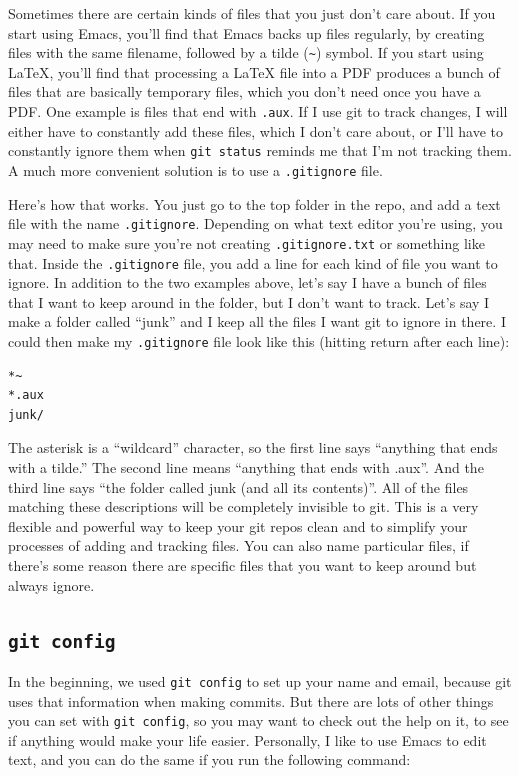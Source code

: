 \documentclass[11pt]{article}
\begin{document}
Sometimes there are certain kinds of files that you just don't care about.  If you start using Emacs, you'll find that Emacs backs up files regularly, by creating files with the same filename, followed by a tilde (\texttt{\textasciitilde{}}) symbol. If you start using \LaTeX{}, you'll find that processing a \LaTeX{} file into a PDF produces a bunch of files that are basically temporary files, which you don't need once you have a PDF.  One example is files that end with \texttt{.aux}.  If I use git to track changes, I will either have to constantly add these files, which I don't care about, or I'll have to constantly ignore them when \texttt{git status} reminds me that I'm not tracking them.  A much more convenient solution is to use a \texttt{.gitignore} file.  

Here's how that works. You just go to the top folder in the repo, and add a text file with the name \texttt{.gitignore}.  Depending on what text editor you're using, you may need to make sure you're not creating \texttt{.gitignore.txt} or something like that.  Inside the \texttt{.gitignore} file, you add a line for each kind of file you want to ignore.  In addition to the two examples above, let's say I have a bunch of files that I want to keep around in the folder, but I don't want to track. Let's say I make a folder called ``junk'' and I keep all the files I want git to ignore in there.  I could then make my \texttt{.gitignore} file look like this (hitting return after each line):


\begin{verbatim}
*~
*.aux
junk/
\end{verbatim}

The asterisk is a ``wildcard'' character, so the first line says ``anything that ends with a tilde.''  The second line means ``anything that ends with .aux''. And the third line says ``the folder called junk (and all its contents)''.  All of the files matching these descriptions will be completely invisible to git. This is a very flexible and powerful way to keep your git repos clean and to simplify your processes of adding and tracking files.  You can also name particular files, if there's some reason there are specific files that you want to keep around but always ignore.
\subsection{\texttt{git config}}
\label{sec-10-2}

In the beginning, we used \texttt{git config} to set up your name and email, because git uses that information when making commits. But there are lots of other things you can set with \texttt{git config}, so you may want to check out the help on it, to see if anything would make your life easier.  Personally, I like to use Emacs to edit text, and you can do the same if you run the following command:
\end{document}
